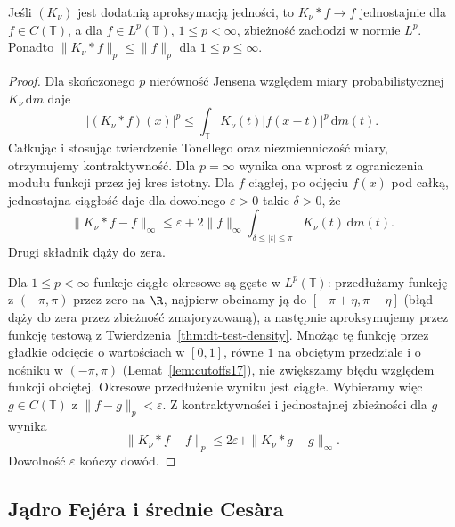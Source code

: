 \begin{twierdzenie}
\label{thm:dt-periodic-approximate-identity}
Jeśli $(K_\nu)$ jest dodatnią aproksymacją jedności,
to $K_\nu*f\to f$ jednostajnie dla $f\in C(\mathbb T)$,
a dla $f\in L^p(\mathbb T)$, $1\le p<\infty$,
zbieżność zachodzi w normie $L^p$.
Ponadto $\|K_\nu*f\|_p\le\|f\|_p$
dla $1\le p\le\infty$.
\end{twierdzenie}
\begin{proof}
Dla skończonego $p$ nierówność Jensena względem
miary probabilistycznej $K_\nu\,\mathrm dm$ daje
\[
 |(K_\nu*f)(x)|^p
 \le\int_{\mathbb T}K_\nu(t)|f(x-t)|^p\,\mathrm dm(t).
\]
Całkując i stosując twierdzenie Tonellego oraz
niezmienniczość miary, otrzymujemy kontraktywność.
Dla $p=\infty$ wynika ona wprost z ograniczenia
modułu funkcji przez jej kres istotny.
Dla $f$ ciągłej, po odjęciu $f(x)$ pod całką,
jednostajna ciągłość daje dla dowolnego
$\varepsilon>0$ takie $\delta>0$, że
\[
 \|K_\nu*f-f\|_\infty
 \le\varepsilon+2\|f\|_\infty
 \int_{\delta\le|t|\le\pi}K_\nu(t)\,\mathrm dm(t).
\]
Drugi składnik dąży do zera.

Dla $1\le p<\infty$ funkcje ciągłe okresowe
są gęste w $L^p(\mathbb T)$: przedłużamy funkcję
z $(-\pi,\pi)$ przez zero na $\R$, najpierw obcinamy
ją do $[-\pi+\eta,\pi-\eta]$ (błąd dąży do zera
przez zbieżność zmajoryzowaną), a następnie
aproksymujemy przez funkcję testową z
Twierdzenia~\ref{thm:dt-test-density}.
Mnożąc tę funkcję przez gładkie odcięcie
o wartościach w $[0,1]$, równe $1$ na obciętym
przedziale i o nośniku w $(-\pi,\pi)$
(Lemat~\ref{lem:cutoffs17}), nie zwiększamy błędu
względem funkcji obciętej. Okresowe przedłużenie
wyniku jest ciągłe. Wybieramy więc $g\in C(\mathbb T)$
z $\|f-g\|_p<\varepsilon$.
Z kontraktywności i jednostajnej zbieżności dla $g$
wynika
\[
 \|K_\nu*f-f\|_p
 \le 2\varepsilon+\|K_\nu*g-g\|_\infty.
\]
Dowolność $\varepsilon$ kończy dowód.
\end{proof}

\subsection{Jądro Fejéra i średnie Cesàra}

